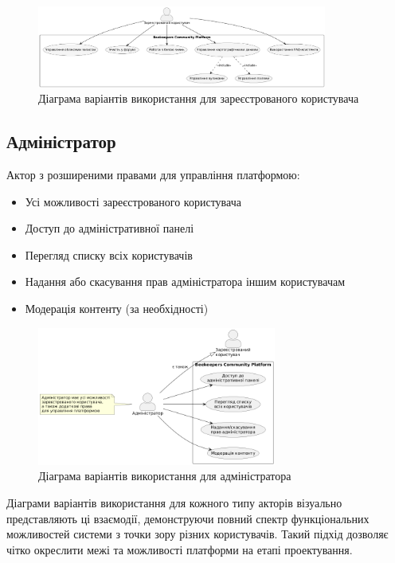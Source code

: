\begin{figure}[htbp]
  \centering
  \includegraphics[width=0.85\textwidth]{practice_report/images/usecase_user.png}
  \caption{Діаграма варіантів використання для зареєстрованого користувача}
  \label{fig:usecase_user}
\end{figure}

\subsection{Адміністратор}
Актор з розширеними правами для управління платформою:
\begin{itemize}
    \item Усі можливості зареєстрованого користувача
    \item Доступ до адміністративної панелі
    \item Перегляд списку всіх користувачів
    \item Надання або скасування прав адміністратора іншим користувачам
    \item Модерація контенту (за необхідності)
\end{itemize}

\begin{figure}[htbp]
  \centering
  \includegraphics[width=0.7\textwidth]{practice_report/images/usecase_admin.png}
  \caption{Діаграма варіантів використання для адміністратора}
  \label{fig:usecase_admin}
\end{figure}

Діаграми варіантів використання для кожного типу акторів візуально представляють ці взаємодії, демонструючи повний спектр функціональних можливостей системи з точки зору різних користувачів. Такий підхід дозволяє чітко окреслити межі та можливості платформи на етапі проектування.

